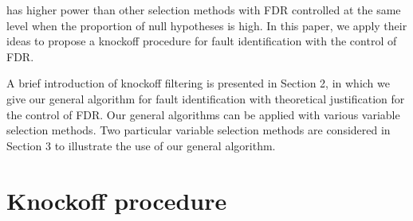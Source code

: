 \documentclass[a4paper,12pt]{article}
\begin{document}
has higher power than other selection methods with FDR controlled at the same level when the proportion of null hypotheses is high. In this paper, we apply their ideas to propose a knockoff procedure for fault identification with the control of FDR.

A brief introduction of knockoff filtering is presented in Section 2, in which we give our general algorithm for fault identification with theoretical justification for the control of FDR. Our general algorithms can be applied with various variable selection methods. Two particular variable selection methods are considered in Section 3 to illustrate the use of our general algorithm.

%
%
%
%
%
%
%
%
%
%
%
%
%
%
%
%

\section{Knockoff procedure}
\end{document}
